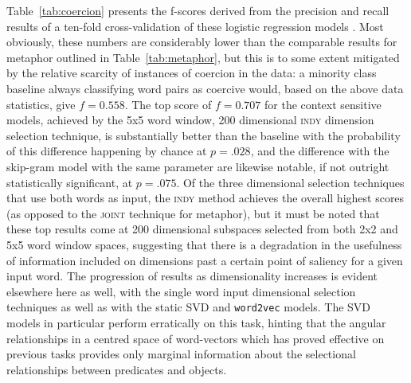 Table~\ref{tab:coercion} presents the f-scores derived from the precision and recall results of a ten-fold cross-validation of these logistic regression models .  Most obviously, these numbers are considerably lower than the comparable results for metaphor outlined in Table~\ref{tab:metaphor}, but this is to some extent mitigated by the relative scarcity of instances of coercion in the data: a minority class baseline always classifying word pairs as coercive would, based on the above data statistics, give $f = 0.558$.  The top score of $f = 0.707$ for the context sensitive models, achieved by the 5x5 word window, 200 dimensional \textsc{indy} dimension selection technique, is substantially better than the baseline with the probability of this difference happening by chance at $p = .028$, and the difference with the skip-gram model with the same parameter are likewise notable, if not outright statistically significant, at $p = .075$.  Of the three dimensional selection techniques that use both words as input, the \textsc{indy} method achieves the overall highest scores (as opposed to the \textsc{joint} technique for metaphor), but it must be noted that these top results come at 200 dimensional subspaces selected from both 2x2 and 5x5 word window spaces, suggesting that there is a degradation in the usefulness of information included on dimensions past a certain point of saliency for a given input word.  The progression of results as dimensionality increases is evident elsewhere here as well, with the single word input dimensional selection techniques as well as with the static SVD and \texttt{word2vec} models.  The SVD models in particular perform erratically on this task, hinting that the angular relationships in a centred space of word-vectors which has proved effective on previous tasks provides only marginal information about the selectional relationships between predicates and objects.

